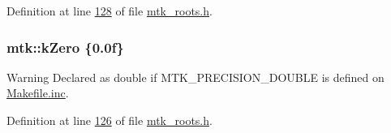 Definition at line \hyperlink{mtk__roots_8h_source_l00128}{128} of file \hyperlink{mtk__roots_8h_source}{mtk\+\_\+roots.\+h}.

\hypertarget{group__c01-roots_ga59a451a5fae30d59649bcda274fea271}{
\subsubsection[{k\+Zero}]{\setlength{\rightskip}{0pt plus 5cm}mtk\+::k\+Zero \{0.\+0f\}}}\label{group__c01-roots_ga59a451a5fae30d59649bcda274fea271}
\begin{DoxyWarning}{Warning}
Declared as double if M\+T\+K\+\_\+\+P\+R\+E\+C\+I\+S\+I\+O\+N\+\_\+\+D\+O\+U\+B\+L\+E is defined on \hyperlink{Makefile_8inc}{Makefile.\+inc}. 
\end{DoxyWarning}


Definition at line \hyperlink{mtk__roots_8h_source_l00126}{126} of file \hyperlink{mtk__roots_8h_source}{mtk\+\_\+roots.\+h}.

